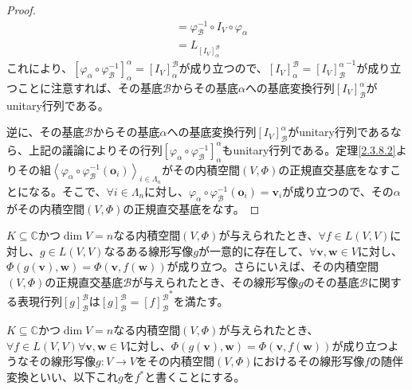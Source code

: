 \documentclass[dvipdfmx]{jsarticle}
\begin{document}
\begin{proof}
\begin{align*}
&= \varphi_{\mathcal{B}}^{- 1} \circ I_{V} \circ \varphi_{\alpha}\\
&= L_{\left[ I_{V} \right]^{\mathcal{B}}_{\alpha}}
\end{align*}
これにより、$\left[ \varphi_{\alpha} \circ \varphi_{\mathcal{B}}^{- 1} \right]_{\alpha}^{\alpha} = \left[ I_{V} \right]^{\mathcal{B}}_{\alpha}$が成り立つので、$\left[ I_{V} \right]^{\mathcal{B}}_{\alpha} = {\left[ I_{V} \right]^{\alpha}_{\mathcal{B}}}^{- 1}$が成り立つことに注意すれば、その基底$\mathcal{B}$からその基底$\alpha$への基底変換行列$\left[ I_{V} \right]^{\alpha}_{\mathcal{B}}$がunitary行列である。\par
逆に、その基底$\mathcal{B}$からその基底$\alpha$への基底変換行列$\left[ I_{V} \right]^{\alpha}_{\mathcal{B}}$がunitary行列であるなら、上記の議論によりその行列$\left[ \varphi_{\alpha} \circ \varphi_{\mathcal{B}}^{- 1} \right]_{\alpha}^{\alpha}$もunitary行列である。定理\ref{2.3.8.2}よりその組$\left\langle \varphi_{\alpha} \circ \varphi_{\mathcal{B}}^{- 1}\left( \mathbf{o}_{i} \right) \right\rangle_{i \in \varLambda_{n}}$がその内積空間$(V,\varPhi)$の正規直交基底をなすことになる。そこで、$\forall i \in \varLambda_{n}$に対し、$\varphi_{\alpha} \circ \varphi_{\mathcal{B}}^{- 1}\left( \mathbf{o}_{i} \right) = \mathbf{v}_{i}$が成り立つので、その$\alpha$がその内積空間$(V,\varPhi)$の正規直交基底をなす。
\end{proof}
\begin{thm}\label{2.3.8.5}
$K \subseteq \mathbb{C}$かつ$\dim V = n$なる内積空間$(V,\varPhi)$が与えられたとき、$\forall f \in L(V,V)$に対し、$g \in L(V,V)$なるある線形写像$g$が一意的に存在して、$\forall\mathbf{v},\mathbf{w} \in V$に対し、$\varPhi\left( g\left( \mathbf{v} \right),\mathbf{w} \right) = \varPhi\left( \mathbf{v},f\left( \mathbf{w} \right) \right)$が成り立つ。さらにいえば、その内積空間$(V,\varPhi)$の正規直交基底$\mathcal{B}$が与えられたとき、その線形写像$g$のその基底$\mathcal{B}$に関する表現行列$[ g]_{\mathcal{B}}^{\mathcal{B}}$は$[ g]_{\mathcal{B}}^{\mathcal{B}} = {[ f]_{\mathcal{B}}^{\mathcal{B}}}^{*}$を満たす。
\end{thm}
\begin{dfn}
$K \subseteq \mathbb{C}$かつ$\dim V = n$なる内積空間$(V,\varPhi)$が与えられたとき、$\forall f \in L(V,V)\forall\mathbf{v},\mathbf{w} \in V$に対し、$\varPhi\left( g\left( \mathbf{v} \right),\mathbf{w} \right) = \varPhi\left( \mathbf{v},f\left( \mathbf{w} \right) \right)$が成り立つようなその線形写像$g:V \rightarrow V$をその内積空間$(V,\varPhi)$におけるその線形写像$f$の随伴変換といい、以下これ$g$を$f^{*}$と書くことにする。
\end{dfn}
\end{document}
